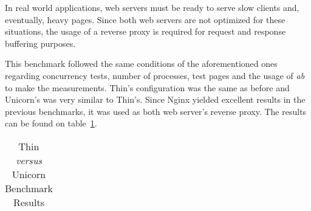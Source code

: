 In real world applications, web servers must be ready to serve slow clients and, eventually, heavy pages. Since both web servers are not optimized for these situations, the usage of a reverse proxy is required for request and response buffering purposes.

This benchmark followed the same conditions of the aforementioned ones regarding concurrency tests, number of processes, test pages and the usage of \textit{ab} to make the measurements. Thin's configuration was the same as before and Unicorn's was very similar to Thin's. Since Nginx yielded excellent results in the previous benchmarks, it was used as both web server's reverse proxy. The results can be found on table~\ref{tab:thin_unicorn_benchmark}.

\begin{table}[h!t]
  \centering
  \caption{Thin \textit{versus} Unicorn Benchmark Results}
  \label{tab:thin_unicorn_benchmark}
  
  \begin{tabular}{c|c|c|c|c|c}


\end{tabular}
\end{table}
